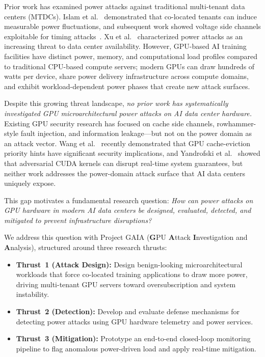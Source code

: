 \documentclass[letterpaper,twocolumn,10pt]{article}
\begin{document}
Prior work has examined power attacks against traditional multi-tenant
data centers (MTDCs).  Islam et al.~\cite{islam2017} demonstrated
that co-located tenants can induce measurable power fluctuations, and
subsequent work showed voltage side channels exploitable for timing
attacks~\cite{islam2018}.  Xu et al.~\cite{xu2014} characterized
power attacks as an increasing threat to data center availability.
However, GPU-based AI training facilities have distinct power,
memory, and computational load profiles compared to traditional
CPU-based compute servers; modern GPUs can draw hundreds of watts
per device, share power delivery infrastructure across compute
domains, and exhibit workload-dependent power phases that create
new attack surfaces.

Despite this growing threat landscape, \emph{no prior work has
systematically investigated GPU microarchitectural power attacks on
AI data center hardware.}  Existing GPU security research has
focused on cache side channels, rowhammer-style fault injection,
and information leakage---but not on the power domain as an attack
vector.  Wang et al.~\cite{wang2025} recently demonstrated that GPU
cache-eviction priority hints have significant security implications,
and Yandrofski et al.~\cite{yandrofski2022} showed that adversarial
CUDA kernels can disrupt real-time system guarantees, but neither
work addresses the power-domain attack surface that AI data centers
uniquely expose.

This gap motivates a fundamental research question: \emph{How can
power attacks on GPU hardware in modern AI data centers be designed,
evaluated, detected, and mitigated to prevent infrastructure
disruptions?}

We address this question with Project GAIA (\textbf{G}PU
\textbf{A}ttack \textbf{I}nvestigation and \textbf{A}nalysis),
structured around three research thrusts:

\begin{itemize}[nosep]
\item \textbf{Thrust~1 (Attack Design):} Design benign-looking
  microarchitectural workloads that force co-located training
  applications to draw more power, driving multi-tenant GPU servers
  toward oversubscription and system instability.
\item \textbf{Thrust~2 (Detection):} Develop and evaluate defense
  mechanisms for detecting power attacks using GPU hardware telemetry
  and power services.
\item \textbf{Thrust~3 (Mitigation):} Prototype an end-to-end
  closed-loop monitoring pipeline to flag anomalous power-driven
  load and apply real-time mitigation.
\end{itemize}
\end{document}
